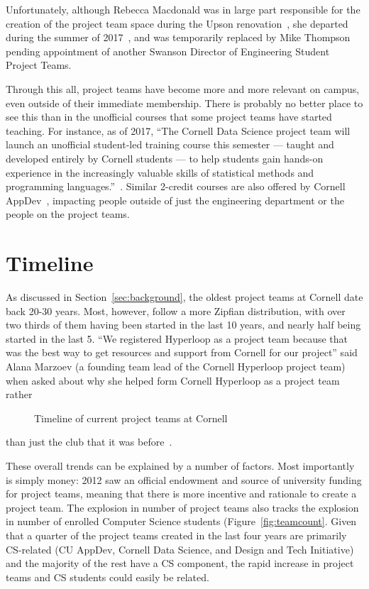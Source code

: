 \documentclass[12pt]{article}
\begin{document}
Unfortunately, although Rebecca Macdonald was in large part responsible for the creation of the project team space during the Upson renovation~\cite{noauthor_q&rebecca_2014}, she departed during the summer of 2017~\cite{macdonald_thank_2017}, and was temporarily replaced by Mike Thompson~\cite{ivory_thank_2017} pending appointment of another Swanson Director of Engineering Student Project Teams.

Through this all, project teams have become more and more relevant on campus, even outside of their immediate membership.
There is probably no better place to see this than in the unofficial courses that some project teams have started teaching.
For instance, as of 2017, ``The Cornell Data Science project team will launch an unofficial student-led training course this semester — taught and developed entirely by Cornell students — to help students gain hands-on experience in the increasingly valuable skills of statistical methods and programming languages.''~\cite{si_cornell_2017}.
Similar 2-credit courses are also offered by Cornell AppDev~\cite{noauthor_cornell_2018-5}, impacting people outside of just the engineering department or the people on the project teams.

\section{Timeline}
\label{sec:timeline}

As discussed in Section~\ref{sec:background}, the oldest project teams at Cornell date back 20-30 years.
Most, however, follow a more Zipfian distribution, with over two thirds of them having been started in the last 10 years, and nearly half being started in the last 5.
``We registered Hyperloop as a project team because that was the best way to get resources and support from Cornell for our project'' said Alana Marzoev (a founding team lead of the Cornell Hyperloop project team) when asked about why she helped form Cornell Hyperloop as a project team rather

\begin{landscape}
  \begin{figure}
    
    \caption{Timeline of current project teams at Cornell}
    \label{fig:timeline}
  \end{figure}
\end{landscape}

\noindent than just the club that it was before~\cite{marzoev_rationale_2018}.

These overall trends can be explained by a number of factors.
Most importantly is simply money: 2012 saw an official endowment and source of university funding for project teams, meaning that there is more incentive and rationale to create a project team. The explosion in number of project teams also tracks the explosion in number of enrolled Computer Science students (Figure~\ref{fig:teamcount}.
Given that a quarter of the project teams created in the last four years are primarily CS-related (CU AppDev, Cornell Data Science, and Design and Tech Initiative) and the majority of the rest have a CS component, the rapid increase in project teams and CS students could easily be related.
\end{document}
